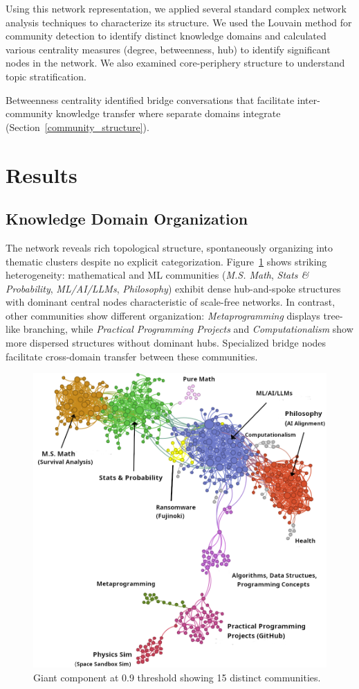 \documentclass{svproc}
\begin{document}
Using this network representation, we applied several standard complex network analysis techniques to characterize its structure. We used the Louvain method \cite{blondel2008} for community detection to identify distinct knowledge domains and calculated various centrality measures (degree, betweenness, hub) to identify significant nodes in the network. We also examined core-periphery structure to understand topic stratification.

Betweenness centrality identified bridge conversations that facilitate inter-community knowledge transfer where separate domains integrate (Section~\ref{community_structure}).

\section{Results}

\subsection{Knowledge Domain Organization}

The network reveals rich topological structure, spontaneously organizing into thematic clusters despite no explicit categorization. Figure~\ref{fig:network_vis} shows striking heterogeneity: mathematical and ML communities (\emph{M.S. Math}, \emph{Stats \& Probability}, \emph{ML/AI/LLMs}, \emph{Philosophy}) exhibit dense hub-and-spoke structures with dominant central nodes characteristic of scale-free networks. In contrast, other communities show different organization: \emph{Metaprogramming} displays tree-like branching, while \emph{Practical Programming Projects} and \emph{Computationalism} show more dispersed structures without dominant hubs. Specialized bridge nodes facilitate cross-domain transfer between these communities.

\begin{figure}[t]
\centering
\includegraphics[width=4.5in]{./images/cluster-vis-topics-better.png}
\caption{Giant component at 0.9 threshold showing 15 distinct communities.}
\label{fig:network_vis}
\end{figure}
\end{document}
